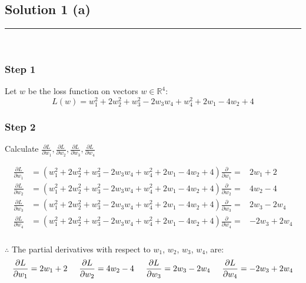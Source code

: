 \documentclass{article}
\begin{document}
\pagestyle{fancy}

\subsection*{Solution 1 (a)}
\noindent\rule{\textwidth}{0.4pt}\\

\subsubsection*{Step 1}
\parbox{\textwidth}{
Let $w$ be the loss function on vectors $w \in \mathbb{R}^4$:
$$
L(w) = w_1^2 + 2w_2^2 + w_3^2 - 2w_3w_4 + w_4^2 + 2w_1 - 4w_2 + 4
$$
}

\subsubsection*{Step 2}
\parbox{\textwidth}{
Calculate $\frac{\partial L}{\partial w_1}, \frac{\partial L}{\partial w_2}, \frac{\partial L}{\partial w_3}, \frac{\partial L}{\partial w_4}$
}
\[
\begin{aligned}
\frac{\partial L}{\partial w_1} &= \left(w_1^2 + 2w_2^2 + w_3^2 - 2w_3w_4 + w_4^2 + 2w_1 - 4w_2 + 4\right) \frac{\partial}{\partial w_1} =& 2w_1 + 2 \\
\frac{\partial L}{\partial w_2} &=  \left(w_1^2 + 2w_2^2 + w_3^2 - 2w_3w_4 + w_4^2 + 2w_1 - 4w_2 + 4\right) \frac{\partial}{\partial w_2} =& 4w_2 - 4 \\
\frac{\partial L}{\partial w_3} &= \left(w_1^2 + 2w_2^2 + w_3^2 - 2w_3w_4 + w_4^2 + 2w_1 - 4w_2 + 4\right) \frac{\partial}{\partial w_3} =& 2w_3 - 2w_4 \\
\frac{\partial L}{\partial w_4} &= \left(w_1^2 + 2w_2^2 + w_3^2 - 2w_3w_4 + w_4^2 + 2w_1 - 4w_2 + 4\right) \frac{\partial}{\partial w_4} =& -2w_3 + 2w_4
\end{aligned}
\]

\subsubsection*{\normalfont}{$\therefore$ The partial derivatives with respect to $w_1$, $w_2$, $w_3$, $w_4$, are:}
$$
\frac{\partial L}{\partial w_1} = 2w_1 + 2 \hspace{0.5cm} \frac{\partial L}{\partial w_2} = 4w_2 - 4  \hspace{0.5cm} \frac{\partial L}{\partial w_3} = 2w_3 - 2w_4 \hspace{0.5cm} \frac{\partial L}{\partial w_4} = -2w_3 + 2w_4
$$
\end{document}
